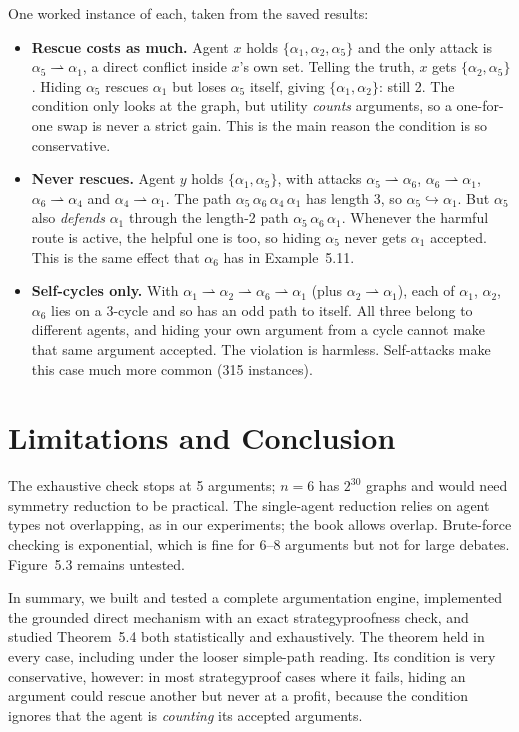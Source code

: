\documentclass[11pt,a4paper]{article}
\newcommand{\A}[1]{\alpha_{#1}}
\newcommand{\att}{\rightharpoonup}
\newcommand{\ind}{\hookrightarrow}
\begin{document}
One worked instance of each, taken from the saved results:

\begin{itemize}
  \item \textbf{Rescue costs as much.} Agent $x$ holds $\{\A1,\A2,\A5\}$ and
        the only attack is $\A5 \att \A1$, a direct conflict inside $x$'s own
        set. Telling the truth, $x$ gets $\{\A2,\A5\}$. Hiding $\A5$ rescues
        $\A1$ but loses $\A5$ itself, giving $\{\A1,\A2\}$: still 2. The
        condition only looks at the graph, but utility \emph{counts}
        arguments, so a one-for-one swap is never a strict gain. This is the
        main reason the condition is so conservative.
  \item \textbf{Never rescues.} Agent $y$ holds $\{\A1,\A5\}$, with attacks
        $\A5 \att \A6$, $\A6 \att \A1$, $\A6 \att \A4$ and $\A4 \att \A1$.
        The path $\A5\,\A6\,\A4\,\A1$ has length 3, so $\A5 \ind \A1$. But
        $\A5$ also \emph{defends} $\A1$ through the length-2 path
        $\A5\,\A6\,\A1$. Whenever the harmful route is active, the helpful
        one is too, so hiding $\A5$ never gets $\A1$ accepted. This is the
        same effect that $\A6$ has in Example~5.11.
  \item \textbf{Self-cycles only.} With $\A1 \att \A2 \att \A6 \att \A1$
        (plus $\A2 \att \A1$), each of $\A1$, $\A2$, $\A6$ lies on a 3-cycle
        and so has an odd path to itself. All three belong to different
        agents, and hiding your own argument from a cycle cannot make that
        same argument accepted. The violation is harmless. Self-attacks make
        this case much more common (315 instances).
\end{itemize}

\section{Limitations and Conclusion}

The exhaustive check stops at 5 arguments; $n = 6$ has $2^{30}$ graphs and
would need symmetry reduction to be practical. The single-agent reduction
relies on agent types not overlapping, as in our experiments; the book allows
overlap. Brute-force checking is exponential, which is fine for 6--8
arguments but not for large debates. Figure~5.3 remains untested.

In summary, we built and tested a complete argumentation engine, implemented
the grounded direct mechanism with an exact strategyproofness check, and
studied Theorem~5.4 both statistically and exhaustively. The theorem held in
every case, including under the looser simple-path reading. Its condition is
very conservative, however: in most strategyproof cases where it fails,
hiding an argument could rescue another but never at a profit, because the
condition ignores that the agent is \emph{counting} its accepted arguments.
\end{document}
